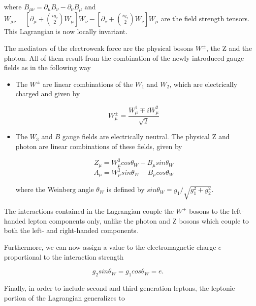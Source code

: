  where $B_{\mu\nu}=\partial_{\mu}B_{\nu}-\partial_{\nu}B_{\mu}$ and $W_{\mu\nu} = [\partial_{\mu}+(\frac{ig_{2}}{2})W_{\mu}]W_{\nu} - [\partial_{\nu}+(\frac{ig_{2}}{2})W_{\nu}]W_{\mu}$ are the field strength tensors. This Lagrangian is now locally invariant.

 The mediators of the electroweak force are the physical bosons $W^{\pm}$, the Z and the photon. All of them result from the combination of the newly introduced gauge fields as in the following way

 \begin{itemize}

	 \item The $W^{\pm}$ are linear combinations of the $W_{1}$ and $W_{2}$, which are electrically charged and given by

	 \begin{equation}
		W_{\mu}^{\pm} = \frac{W_{\mu}^{1}\mp i W_{\mu}^{2}}{\sqrt{2}}
	\end{equation}

	\item The $W_{3}$ and $B$ gauge fields are electrically neutral. The physical Z and photon are linear combinations of these fields, given by

	\begin{equation}
	Z_{\mu} = W_{\mu}^{3}cos\theta_{W} - B_{\mu}sin\theta_{W}
	\end{equation}
	\begin{equation}
	A_{\mu} = W_{\mu}^{3}sin\theta_{W} - B_{\mu}cos\theta_{W}
	\end{equation}

	where the Weinberg angle $\theta_{W}$ is defined by $sin\theta_{W}= g_{1}/\sqrt{g_{1}^{2}+g_{2}^{2}}$.

\end{itemize}

The interactions contained in the Lagrangian couple the $W^{\pm}$ bosons to the left-handed lepton components only, unlike the photon and Z bosons which couple to both the left- and right-handed components. 

Furthermore, we can now assign a value to the electromagnetic charge $e$ proportional to the interaction strength

\begin{equation}
g_{2}sin\theta_{W}=g_{1}cos\theta_{W}=e.
\end{equation}

Finally, in order to include second and third generation leptons, the leptonic portion of the Lagrangian generalizes to 

